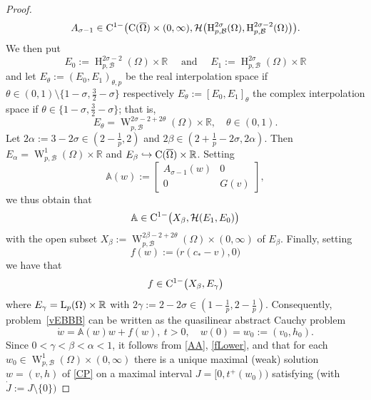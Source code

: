 \documentclass[reqno,11pt]{amsart}
\numberwithin{equation}{section}
\newcommand{\R}{\mathbb{R}}
\begin{document}
\begin{proof}
\begin{equation}\label{Asigma}
  A_{\sigma-1}\in{\rm C}^{1-}\big(
  {\rm C}(\overline{\Omega})\times
  (0,\infty),\mathcal{H}\bigl(\operatorname{H}_{p,\mathcal{B}}^{2\sigma}(\Omega),
  \operatorname{H} _{p,\mathcal{B}}^{2\sigma-2}(\Omega)\bigr)\big). 
\end{equation}
We then put
$$
E_0:=\operatorname{H}_{p,\mathcal{B}}^{2\sigma-2}(\Omega)\times \R \quad \text{ and }\quad
E_1:=\operatorname{H} _{p,\mathcal{B}}^{2\sigma}(\Omega)\times \R 
$$
and let $E_\theta:=(E_0,E_1)_{\theta,p}$ be the real interpolation space if $\theta\in (0,1)\setminus\{1-\sigma,\frac{3}{2}-\sigma\}$ respectively $E_\theta:=[E_0,E_1]_{\theta}$ the complex  interpolation space if $\theta\in \{1-\sigma,\frac{3}{2}-\sigma\}$; that is,
$$
E_\theta=\operatorname{W}_{p,\mathcal{B}}^{2\sigma-2+2\theta}(\Omega)\times
\R,\quad \theta\in(0,1).
$$
Let $2\alpha:=3-2\sigma\in (2-\frac{1}{p},2)$ and $2\beta\in
(2+\frac{1}{p}-2\sigma,2\alpha)$. Then
$E_\alpha=\operatorname{W}_{p,\mathcal{B}}^{1}(\Omega)\times \R$ and $E_\beta
\hookrightarrow {\rm C}(\overline{\Omega})\times\R$. Setting
$$
\mathbb{A}(w):=\left[\begin{matrix}
A_{\sigma-1}(w)&0\\ 0 & G(v)
\end{matrix}\right],
$$
we thus obtain that
\begin{equation}\label{AA}
\mathbb{A}\in {\rm C}^{1-}\big(X_\beta,\mathcal{H}(E_1,E_0)\big)
\end{equation}
with the open subset
$X_\beta:=\operatorname{W}_{p,\mathcal{B}}^{2\beta-2+2\theta}(\Omega)\times
(0,\infty)$ of $E_\beta$. Finally, setting
$$ f(w):=\big(r(c_*-v),0\big) 
$$
we have that
\begin{equation}\label{fLower}
f\in {\rm C}^{1-}\big(X_\beta,E_\gamma\big)
\end{equation}
where $E_\gamma={\rm L}_p(\Omega)\times \R$ with
$2\gamma:=2-2\sigma \in (1-\frac{1}{p},2-\frac{1}{p})$. Consequently,
problem~\eqref{vEBBB} can be written as the quasilinear abstract Cauchy problem
\begin{equation}\label{CP}
\dot w=\mathbb{A}(w)w +f(w),\  t>0,\quad w(0)=w_0:=(v_0,h_0).
\end{equation}
Since $0<\gamma<\beta<\alpha<1$, it follows from \eqref{AA},
\eqref{fLower}, and \cite[Theorem~12.1]{Amann_Teubner} that for each
$w_0\in \operatorname{W}_{p,\mathcal{B}}^{1}(\Omega)\times (0,\infty)$
there is a unique maximal (weak) solution $w=(v,h)$ of \eqref{CP} on a
maximal interval $J=\bigl[0,t^+(w_0)\bigr)$ satisfying (with $\dot J:=J\setminus\{0\})$

\end{proof}
\end{document}
